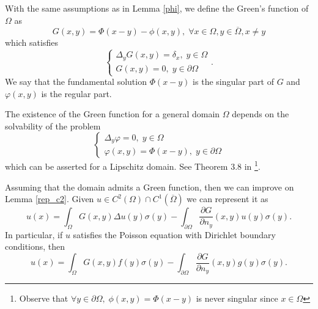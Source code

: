 \begin{definition}
    With the same assumptions as in Lemma \ref{phi}, we define the Green's function of \(\Omega\) as
    \[
    G(x, y) = \Phi(x-y) - \phi(x, y), \; \forall x \in \Omega, y \in \overline{\Omega}, x \neq y   
    \]
    which satisfies 
    \[
        \begin{cases}
            \Delta_y G(x,y) = \delta_x, \; y \in \Omega\\
            G(x, y) = 0, \; y \in \partial \Omega 
        \end{cases}.
    \]
    We say that the fundamental solution \(\Phi(x-y)\) is the singular part of \(G\) and \(\varphi(x,y)\) is the regular part.
\end{definition}
\begin{remark}\label{remarck_green}
    The existence of the Green function for a general domain \(\Omega\) depends on the solvability of the problem 
    \[
        \begin{cases}
            \Delta_y \varphi = 0, \; y \in \Omega\\
            \varphi(x, y) = \Phi(x-y), \; y \in \partial \Omega 
        \end{cases}       
    \]
    which can be asserted for a Lipschitz domain. See Theorem 3.8 in \cite{salsa2016partial}\footnote{Observe that \(\forall y \in \partial \Omega, \; \phi(x, y) = \Phi(x-y)\) is never singular since \(x \in \Omega\)}.

    Assuming that the domain admits a Green function, then we can improve on Lemma \ref{rep_c2}. Given \(u \in C^2(\Omega)\cap C^1(\overline{\Omega})\) we can represent it as
    \[
        u(x) =  \int_{\Omega} G(x, y)\Delta u(y) \sigma(y) -\int_{\partial\Omega} \frac{\partial G}{\partial n_y}(x, y) u(y) \sigma(y).
    \]
    In particular, if \(u\) satisfies the Poisson equation with Dirichlet boundary conditions, then
    \[
        u(x) =  \int_{\Omega} G(x, y) f(y) \sigma(y) -\int_{\partial\Omega} \frac{\partial G}{\partial n_y}(x, y) g(y) \sigma(y).
    \]

\end{remark}

